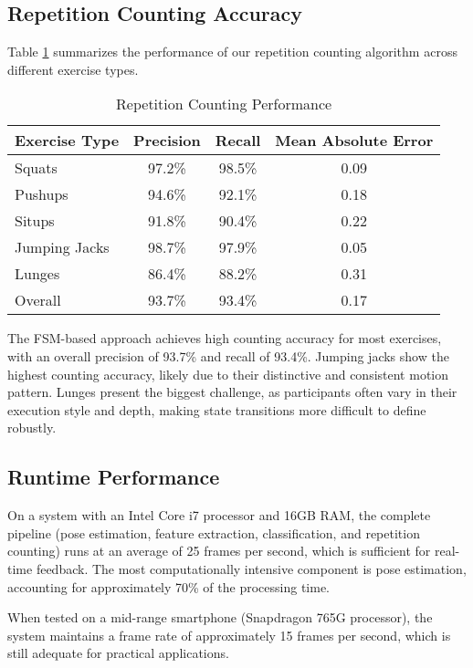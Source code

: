 \documentclass[conference]{IEEEtran}
\begin{document}
\subsection{Repetition Counting Accuracy}
Table \ref{tab:repetition_results} summarizes the performance of our repetition counting algorithm across different exercise types.

\begin{table}[ht]
\centering
\caption{Repetition Counting Performance}
\label{tab:repetition_results}
\begin{tabular}{lccc}
\toprule
\textbf{Exercise Type} & \textbf{Precision} & \textbf{Recall} & \textbf{Mean Absolute Error} \\
\midrule
Squats & 97.2\% & 98.5\% & 0.09 \\
Pushups & 94.6\% & 92.1\% & 0.18 \\
Situps & 91.8\% & 90.4\% & 0.22 \\
Jumping Jacks & 98.7\% & 97.9\% & 0.05 \\
Lunges & 86.4\% & 88.2\% & 0.31 \\
\midrule
Overall & 93.7\% & 93.4\% & 0.17 \\
\bottomrule
\end{tabular}
\end{table}

The FSM-based approach achieves high counting accuracy for most exercises, with an overall precision of 93.7\% and recall of 93.4\%. Jumping jacks show the highest counting accuracy, likely due to their distinctive and consistent motion pattern. Lunges present the biggest challenge, as participants often vary in their execution style and depth, making state transitions more difficult to define robustly.

\subsection{Runtime Performance}
On a system with an Intel Core i7 processor and 16GB RAM, the complete pipeline (pose estimation, feature extraction, classification, and repetition counting) runs at an average of 25 frames per second, which is sufficient for real-time feedback. The most computationally intensive component is pose estimation, accounting for approximately 70\% of the processing time.

When tested on a mid-range smartphone (Snapdragon 765G processor), the system maintains a frame rate of approximately 15 frames per second, which is still adequate for practical applications.
\end{document}
